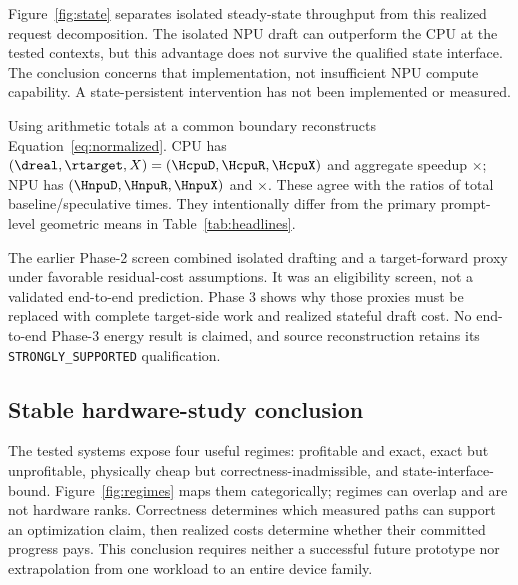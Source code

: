Figure~\ref{fig:state} separates isolated steady-state throughput from this realized request decomposition. The isolated NPU draft can outperform the CPU at the tested contexts, but this advantage does not survive the qualified state interface. The conclusion concerns that implementation, not insufficient NPU compute capability. A state-persistent intervention has not been implemented or measured.

Using arithmetic totals at a common boundary reconstructs Equation~\ref{eq:normalized}. CPU has $(\dreal,\rtarget,X)=(\HcpuD,\HcpuR,\HcpuX)$ and aggregate speedup \HcpuAggregate$\times$; NPU has $(\HnpuD,\HnpuR,\HnpuX)$ and \HnpuAggregate$\times$. These agree with the ratios of total baseline/speculative times. They intentionally differ from the primary prompt-level geometric means in Table~\ref{tab:headlines}.

The earlier Phase-2 screen combined isolated drafting and a target-forward proxy under favorable residual-cost assumptions. It was an eligibility screen, not a validated end-to-end prediction. Phase 3 shows why those proxies must be replaced with complete target-side work and realized stateful draft cost. No end-to-end Phase-3 energy result is claimed, and source reconstruction retains its \texttt{STRONGLY\_SUPPORTED} qualification.

\subsection{Stable hardware-study conclusion}
\label{sec:hardwareconclusion}

The tested systems expose four useful regimes: profitable and exact, exact but unprofitable, physically cheap but correctness-inadmissible, and state-interface-bound. Figure~\ref{fig:regimes} maps them categorically; regimes can overlap and are not hardware ranks. Correctness determines which measured paths can support an optimization claim, then realized costs determine whether their committed progress pays. This conclusion requires neither a successful future prototype nor extrapolation from one workload to an entire device family.
